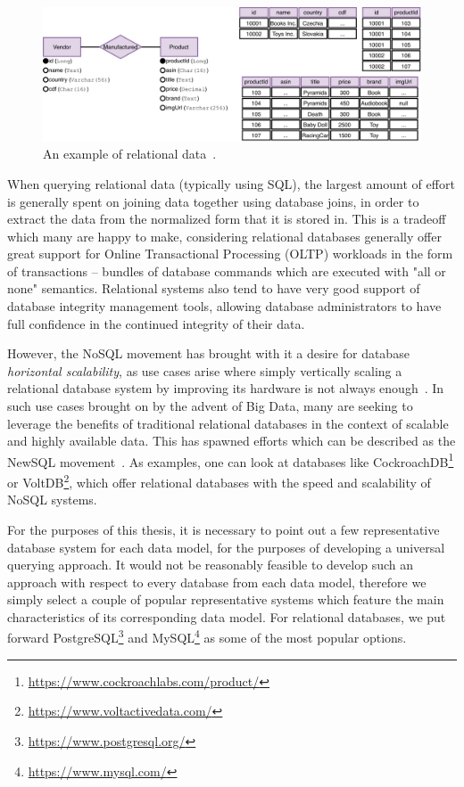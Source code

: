 \begin{figure}[h]
\centering
\includegraphics[scale=0.66]{img/example-relational.pdf}
\caption{An example of relational data~\cite{inference}.}
\label{fig:relationaldata}
\end{figure}

When querying relational data (typically using SQL), the largest amount of effort is generally spent on joining data together using database joins, in order to extract the data from the normalized form that it is stored in.
This is a tradeoff which many are happy to make, considering relational databases generally offer great support for Online Transactional Processing (OLTP) workloads in the form of transactions -- bundles of database commands which are executed with "all or none" semantics.
Relational systems also tend to have very good support of database integrity management tools, allowing database administrators to have full confidence in the continued integrity of their data.

However, the NoSQL movement has brought with it a desire for database \textit{horizontal scalability}, as use cases arise where simply vertically scaling a relational database system by improving its hardware is not always enough~\cite{relational_out}.
In such use cases brought on by the advent of Big Data, many are seeking to leverage the benefits of traditional relational databases in the context of scalable and highly available data.
This has spawned efforts which can be described as the NewSQL movement~\cite{newsql}.
As examples, one can look at databases like CockroachDB\footnote{\url{https://www.cockroachlabs.com/product/}} or VoltDB\footnote{\url{https://www.voltactivedata.com/}}, which offer relational databases with the speed and scalability of NoSQL systems.

For the purposes of this thesis, it is necessary to point out a few representative database system for each data model, for the purposes of developing a universal querying approach.
It would not be reasonably feasible to develop such an approach with respect to every database from each data model, therefore we simply select a couple of popular representative systems which feature the main characteristics of its corresponding data model.
For relational databases, we put forward PostgreSQL\footnote{\url{https://www.postgresql.org/}} and MySQL\footnote{\url{https://www.mysql.com/}} as some of the most popular options.

